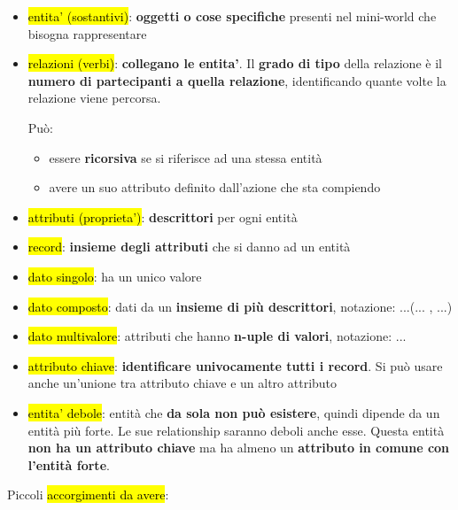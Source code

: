 \begin{itemize}
	\item \hl{entita' (sostantivi)}: \textbf{oggetti o cose specifiche} presenti nel mini-world che bisogna rappresentare

	\item \hl{relazioni (verbi)}: \textbf{collegano le entita'}. Il \textbf{grado di tipo} della relazione è il \textbf{numero di partecipanti a quella relazione}, identificando quante volte la relazione viene percorsa.
		
		Può:
		\begin{itemize}
			\item essere \textbf{ricorsiva} se si riferisce ad una stessa entità
			\item avere un suo attributo definito dall'azione che sta compiendo
		
		\end{itemize}
		
		

	
	\item \hl{attributi (proprieta')}: \textbf{descrittori} per ogni entità
	
	\item \hl{record}: \textbf{insieme degli attributi} che si danno ad un entità
	
	\item \hl{dato singolo}: ha un unico valore
	
	\item \hl{dato composto}: dati da un \textbf{insieme di più descrittori}, notazione: ...(... , ...)
	
	\item \hl{dato multivalore}: attributi che hanno \textbf{n-uple di valori}, notazione: {...}
	
	\item \hl{attributo chiave}: \textbf{identificare univocamente tutti i record}. Si può usare anche un'unione tra attributo chiave e un altro attributo
	
	\item \hl{entita' debole}: entità che \textbf{da sola non può esistere}, quindi dipende da un entità più forte. Le sue relationship saranno deboli anche esse. Questa entità \textbf{non ha un attributo chiave} ma ha almeno un \textbf{attributo in comune con l'entità forte}.
	
\end{itemize}

Piccoli \hl{accorgimenti da avere}:

